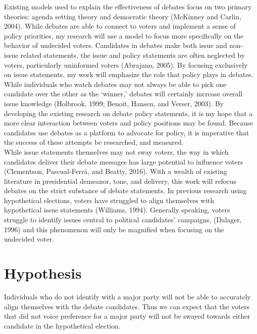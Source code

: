 \documentclass[12pt]{article}
\begin{document}
Existing models used to explain the effectiveness of debates focus on two primary theories: agenda setting theory and democratic theory (McKinney and Carlin, 2004). While debates are able to connect to voters and implement a sense of policy priorities, my research will use a model to focus more specifically on the behavior of undecided voters. Candidates in debates make both issue and non-issue related statements, the issue and policy statements are often neglected by voters, particularly uninformed voters (Abrajano, 2005).  By focusing exclusively on issue statements, my work will emphasize the role that policy plays in debates. While individuals who watch debates may not always be able to pick one candidate over the other as the ‘winner,’ debates will certainly increase overall issue knowledge (Holbrook, 1999; Benoit, Hansen, and Verser, 2003). By developing the existing research on debate policy statements, it is my hope that a more clear interaction between voters and policy positions may be found. Because candidates use debates as a platform to advocate for policy, it is imperative that the success of these attempts be researched, and measured.\\

While issue statements themselves may not sway voters, the way in which candidates deliver their debate messages has large potential to influence voters (Clementson, Pascual‐Ferrá, and Beatty, 2016). With a wealth of existing literature in presidential demeanor, tone, and delivery, this work will refocus debates on the strict substance of debate statements. In previous research using hypothetical elections, voters have struggled to align themselves with hypothetical issue statements (Williams, 1994). Generally speaking, voters struggle to identify issues central to political candidates’ campaigns, (Dalager, 1996) and this phenomenon will only be magnified when focusing on the undecided voter.\\


\section*{Hypothesis}

Individuals who do not identify with a major party will not be able to accurately align themselves with the debate candidates. Thus we can expect that the voters that did not voice preference for a major party will not be swayed towards either candidate in the hypothetical election.\\
\end{document}
